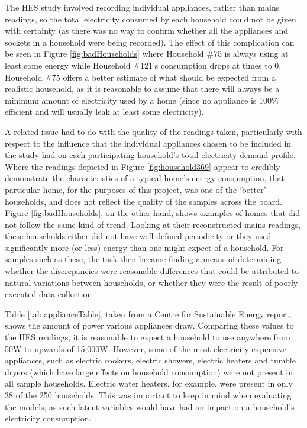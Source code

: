 The HES study involved recording individual appliances, rather than mains readings, so the total electricity consumed by each household could not be given with certainty (as there was no way to confirm whether all the appliances and sockets in a household were being recorded). The effect of this complication can be seen in Figure \ref{fig:badHouseholds} where Household \#75 is always using at least some energy while Household \#121's consumption drops at times to 0. Household \#75 offers a better estimate of what should be expected from a realistic household, as it is reasonable to assume that there will always be a minimum amount of electricity used by a home (since no appliance is 100\% efficient and will usually leak at least some electricity).  

A related issue had to do with the quality of the readings taken, particularly with respect to the influence that the individual appliances chosen to be included in the study had on each participating household's total electricity demand profile. Where the readings depicted in Figure \ref{fig:household369} appear to credibly demonstrate the characteristics of a typical home's energy consumption, that particular home, for the purposes of this project, was one of the `better' households, and does not reflect the quality of the samples across the board.  Figure \ref{fig:badHouseholds}, on the other hand, shows examples of homes that did not follow the same kind of trend. Looking at their reconstructed mains readings, these households either did not have well-defined periodicity or they used significantly more (or less) energy than one might expect of a household.  For samples such as these, the task then became finding a means of determining whether the discrepancies were reasonable differences that could be attributed to natural variations between households, or whether they were the result of poorly executed data collection. 

\badHouseholds

Table \ref{tab:applianceTable}, taken from a Centre for Sustainable Energy \cite{CSE} report, shows the amount of power various appliances draw. Comparing these values to the HES readings, it is reasonable to expect a household to use anywhere from 50W to upwards of 15,000W. However, some of the most electricity-expensive appliances, such as electric cookers, electric showers, electric heaters and tumble dryers (which have large effects on household consumption) were not present in all sample households. Electric water heaters, for example, were present in only 38 of the 250 households. This was important to keep in mind when evaluating the models, as such latent variables would have had an impact on a household's electricity consumption.

